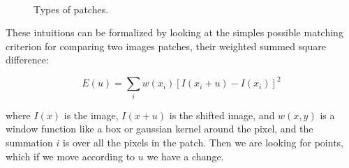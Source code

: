 \begin{figure}[H]
		
\centering

\\


\caption{Types of patches.}
\label{patches}
\end{figure}

These intuitions can be formalized by looking at the simples possible matching criterion for comparing two images patches, their weighted summed square difference:


$$ E(u) = \sum_{i} w(x_{i}) [I(x_{i}+u)-I(x_{i})]^{2}$$

where $I(x)$ is the image, $I(x+u)$ is the shifted image, and $w(x,y)$ is a window function like a box or gaussian kernel around the pixel, and the summation $i$ is over all the pixels in the patch. Then we are looking for points, which if we move according to $u$ we have a change. 



